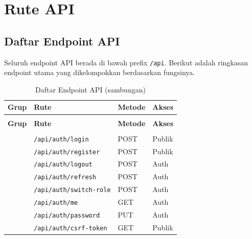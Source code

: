 \documentclass[
  12pt,
  a4paper,
  oneside,
  final
]{report}
\begin{document}
\chapter{Rute API}


\section{Daftar Endpoint API}

Seluruh endpoint API berada di bawah prefix \texttt{/api}.
Berikut adalah ringkasan endpoint utama yang dikelompokkan
berdasarkan fungsinya.

\begin{longtable}[!htbp]{p{4cm} p{5cm} p{3cm} p{2.5cm}}
  \caption{Daftar Endpoint API}
  \label{tab:api-routes} \\

  \toprule
  \textbf{Grup} & \textbf{Rute} & \textbf{Metode} & \textbf{Akses} \\
  \midrule
  \endfirsthead

  \caption[]{Daftar Endpoint API (sambungan)} \\
  \toprule
  \textbf{Grup} & \textbf{Rute} & \textbf{Metode} & \textbf{Akses} \\
  \midrule
  \endhead

  \bottomrule
  \endfoot

  \rowcolor{lightblue}\multicolumn{4}{l}{\textbf{Autentikasi}} \\[4pt]
                   & \texttt{/api/auth/login}         & POST   & Publik \\
                   & \texttt{/api/auth/register}     & POST   & Publik \\
                   & \texttt{/api/auth/logout}       & POST   & Auth \\
                   & \texttt{/api/auth/refresh}      & POST   & Auth \\
                   & \texttt{/api/auth/switch-role}   & POST   & Auth \\
                   & \texttt{/api/auth/me}           & GET    & Auth \\
                   & \texttt{/api/auth/password}      & PUT    & Auth \\
                   & \texttt{/api/auth/csrf-token}   & GET    & Publik \\


\end{longtable}
\end{document}
